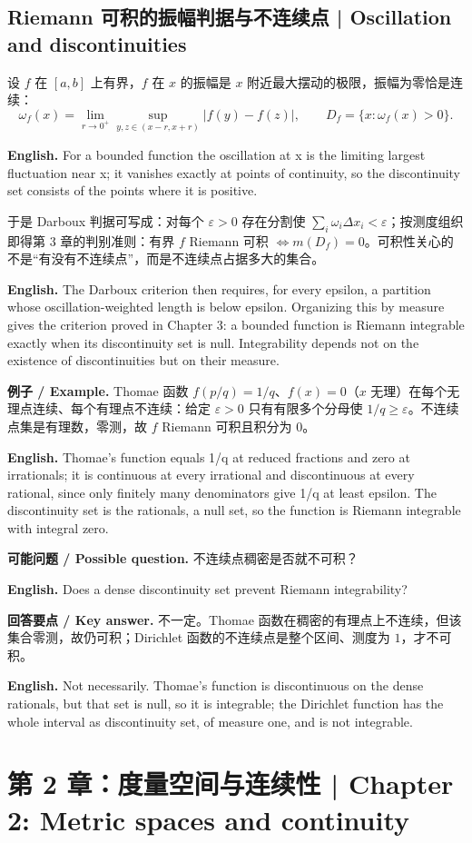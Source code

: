\documentclass[UTF8,11pt,a4paper]{ctexart}
\newcommand{\EN}[1]{\par\noindent\textbf{English.} #1\par}
\let\APSsubsection\subsection
\renewcommand{\subsection}[1]{\Needspace{6\baselineskip}\APSsubsection{#1}}
\newcommand{\chaptersection}[1]{\Needspace{10\baselineskip}\refstepcounter{section}\section*{#1}}
\newcommand{\EX}[2]{\par\noindent\textbf{例子 / Example.} #1\par\EN{#2}}
\newcommand{\ASK}[4]{\par\noindent\textbf{可能问题 / Possible question.} #1\par\EN{#2}\noindent\textbf{回答要点 / Key answer.} #3\par\EN{#4}\medskip}
\begin{document}
\subsection{Riemann 可积的振幅判据与不连续点 | Oscillation and discontinuities}
\noindent 设 $f$ 在 $[a,b]$ 上有界，$f$ 在 $x$ 的振幅是 $x$ 附近最大摆动的极限，振幅为零恰是连续：
\[
\omega_f(x)=\lim_{r\to0^+}\sup_{y,z\in(x-r,x+r)}|f(y)-f(z)|,
\qquad
D_f=\{x:\omega_f(x)>0\}.
\]
\EN{For a bounded function the oscillation at x is the limiting largest fluctuation near x; it vanishes exactly at points of continuity, so the discontinuity set consists of the points where it is positive.}
\noindent 于是 Darboux 判据可写成：对每个 $\varepsilon>0$ 存在分割使 $\sum_i\omega_i\Delta x_i<\varepsilon$；按测度组织即得第 3 章的判别准则：有界 $f$ Riemann 可积 $\iff m(D_f)=0$。可积性关心的不是“有没有不连续点”，而是不连续点占据多大的集合。
\EN{The Darboux criterion then requires, for every epsilon, a partition whose oscillation-weighted length is below epsilon. Organizing this by measure gives the criterion proved in Chapter 3: a bounded function is Riemann integrable exactly when its discontinuity set is null. Integrability depends not on the existence of discontinuities but on their measure.}
\EX{Thomae 函数 $f(p/q)=1/q$、$f(x)=0$（$x$ 无理）在每个无理点连续、每个有理点不连续：给定 $\varepsilon>0$ 只有有限多个分母使 $1/q\ge\varepsilon$。不连续点集是有理数，零测，故 $f$ Riemann 可积且积分为 $0$。}{Thomae's function equals 1/q at reduced fractions and zero at irrationals; it is continuous at every irrational and discontinuous at every rational, since only finitely many denominators give 1/q at least epsilon. The discontinuity set is the rationals, a null set, so the function is Riemann integrable with integral zero.}
\ASK{不连续点稠密是否就不可积？}{Does a dense discontinuity set prevent Riemann integrability?}{不一定。Thomae 函数在稠密的有理点上不连续，但该集合零测，故仍可积；Dirichlet 函数的不连续点是整个区间、测度为 $1$，才不可积。}{Not necessarily. Thomae's function is discontinuous on the dense rationals, but that set is null, so it is integrable; the Dirichlet function has the whole interval as discontinuity set, of measure one, and is not integrable.}

\chaptersection{第 2 章：度量空间与连续性 | Chapter 2: Metric spaces and continuity}
\end{document}
